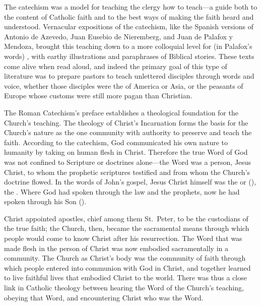 The catechism was a model for teaching the clergy how to teach---a guide both to the content of Catholic faith and to the best ways of making the faith heard and understood.
Vernacular expositions of the catechism, like the Spanish versions of Antonio de Azevedo, Juan Eusebio de Nieremberg, and Juan de Palafox y Mendoza, brought this teaching down to a more colloquial level for (in Palafox's words) , with earthy illustrations and paraphrases of Biblical stories.%
\Autocites{Azevedo:Catecismo}{Nieremberg:PracticaCatecismo}{Palafox:Bocados}
These texts come alive when read aloud, and indeed the primary goal of this type of literature was to prepare pastors to teach unlettered disciples through words and voice, whether those disciples were the  of America or Asia, or the peasants of Europe whose customs were still more pagan than Christian.

The Roman Catechism's preface establishes a theological foundation for the Church's teaching.
The theology of Christ's Incarnation forms the basis for the Church's nature as the one community with authority to preserve and teach the faith.
According to the catechism, God communicated his own nature to humanity by taking on human flesh in Christ.
Therefore the true Word of God was not confined to Scripture or doctrines alone---the Word was a person, Jesus Christ, to whom the prophetic scriptures testified and from whom the Church's doctrine flowed.
In the words of John's gospel, Jesus Christ himself was the  or  (), the .
Where God had spoken through the law and the prophets, now he had spoken through his Son ().

Christ appointed apostles, chief among them St.\ Peter, to be the custodians of the true faith; the Church, then, became the sacramental means through which people would come to know Christ after his resurrection.
The Word that was made flesh in the person of Christ was now embodied sacramentally in a community.
The Church as Christ's body was the community of faith through which people entered into communion with God in Christ, and together learned to live faithful lives that embodied Christ to the world.
There was thus a close link in Catholic theology between hearing the Word of the Church's teaching, obeying that Word, and encountering Christ who was the Word.

